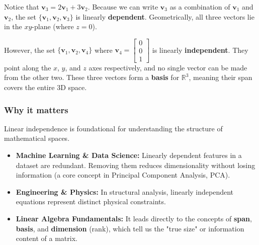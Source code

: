 Notice that $\mathbf{v}_3 = 2\mathbf{v}_1 + 3\mathbf{v}_2$. Because we can write $\mathbf{v}_3$ as a combination of $\mathbf{v}_1$ and $\mathbf{v}_2$, the set $\{\mathbf{v}_1, \mathbf{v}_2, \mathbf{v}_3\}$ is linearly \textbf{dependent}. Geometrically, all three vectors lie in the $xy$-plane (where $z=0$).

However, the set $\{\mathbf{v}_1, \mathbf{v}_2, \mathbf{v}_4\}$ where $\mathbf{v}_4 = \begin{bmatrix} 0 \\ 0 \\ 1 \end{bmatrix}$ is linearly \textbf{independent}. They point along the $x$, $y$, and $z$ axes respectively, and no single vector can be made from the other two. These three vectors form a \textbf{basis} for $\mathbb{R}^3$, meaning their span covers the entire 3D space.

\subsubsection*{Why it matters}
Linear independence is foundational for understanding the structure of mathematical spaces.
\begin{itemize}[leftmargin=*]
    \item \textbf{Machine Learning \& Data Science:} Linearly dependent features in a dataset are redundant. Removing them reduces dimensionality without losing information (a core concept in Principal Component Analysis, PCA).
    \item \textbf{Engineering \& Physics:} In structural analysis, linearly independent equations represent distinct physical constraints.
    \item \textbf{Linear Algebra Fundamentals:} It leads directly to the concepts of \textbf{span}, \textbf{basis}, and \textbf{dimension} (rank), which tell us the "true size" or information content of a matrix.
\end{itemize}
